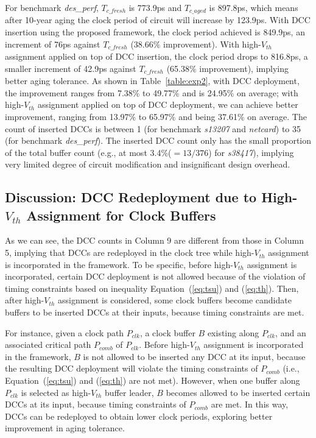 For benchmark \textit{des\_perf}, $T_{c\_fresh}$ is 773.9ps and $T_{c\_aged}$ is 897.8ps, which means after 10-year aging the clock period of circuit will increase by 123.9ps. With DCC insertion using the proposed framework, the clock period achieved is 849.9ps, an increment of 76ps against $T_{c\_fresh}$ (38.66\% improvement). With high-$V_{th}$ assignment applied on top of DCC insertion, the clock period drops to 816.8ps, a smaller increment of 42.9ps against $T_{c\_fresh}$ (65.38\% improvement), implying better aging tolerance. As shown in Table~\ref{table:exp2}, with DCC deployment, the improvement ranges from 7.38\% to 49.77\% and is 24.95\% on average; with high-$V_{th}$ assignment applied on top of DCC deployment, we can achieve better improvement, ranging from 13.97\% to 65.97\% and being 37.61\% on average. The count of inserted DCCs is between 1 (for benchmark \textit{s13207} and \textit{netcard}) to 35 (for benchmark \textit{des\_perf}). The inserted DCC count only has the small proportion of the total buffer count (e.g., at most 3.4\%($= 13/376$) for \textit{s38417}), implying very limited degree of circuit modification and insignificant design overhead. %

\subsection{Discussion: DCC Redeployment due to High-$V_{th}$ Assignment for Clock Buffers}
As we can see, the DCC counts in Column 9 are different from those in Column 5, implying that DCCs are redeployed in the clock tree while high-$V_{th}$ assignment is incorporated in the framework. 
To be specific, before high-$V_{th}$ assignment is incorporated, certain DCC deployment is not allowed because of the violation of timing constraints based on inequality Equation~(\ref{eq:tsu}) and (\ref{eq:th}). Then, after high-$V_{th}$ assignment is considered, some clock buffers become candidate buffers to be inserted DCCs at their inputs, because timing constraints are met. 

For instance, given a clock path $P_{clk}$, a clock buffer $B$ existing along $P_{clk}$, and an associated critical path $P_{comb}$ of $P_{clk}$. Before high-$V_{th}$ assignment is incorporated in the framework, $B$ is not allowed to be inserted any DCC at its input, because the resulting DCC deployment will violate the timing constraints of $P_{comb}$ (i.e., Equation~(\ref{eq:tsu}) and (\ref{eq:th}) are not met). However, when one buffer along $P_{clk}$ is selected as high-$V_{th}$ buffer leader, $B$ becomes allowed to be inserted certain DCCs at its input, because timing constraints of $P_{comb}$ are met. In this way, DCCs can be redeployed to obtain lower clock periods, exploring better improvement in aging tolerance.


